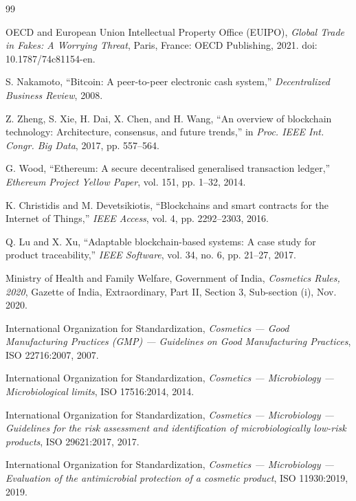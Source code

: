 \documentclass[12pt,a4paper]{report}
\begin{document}
\begin{thebibliography}{99}

 OECD and European Union Intellectual Property Office (EUIPO), \textit{Global Trade in Fakes: A Worrying Threat}, Paris, France: OECD Publishing, 2021. doi: 10.1787/74c81154-en.

 S. Nakamoto, ``Bitcoin: A peer-to-peer electronic cash system,'' \textit{Decentralized Business Review}, 2008.

 Z. Zheng, S. Xie, H. Dai, X. Chen, and H. Wang, ``An overview of blockchain technology: Architecture, consensus, and future trends,'' in \textit{Proc. IEEE Int. Congr. Big Data}, 2017, pp. 557--564.

 G. Wood, ``Ethereum: A secure decentralised generalised transaction ledger,'' \textit{Ethereum Project Yellow Paper}, vol. 151, pp. 1--32, 2014.

 K. Christidis and M. Devetsikiotis, ``Blockchains and smart contracts for the Internet of Things,'' \textit{IEEE Access}, vol. 4, pp. 2292--2303, 2016.

 Q. Lu and X. Xu, ``Adaptable blockchain-based systems: A case study for product traceability,'' \textit{IEEE Software}, vol. 34, no. 6, pp. 21--27, 2017.

 Ministry of Health and Family Welfare, Government of India, \textit{Cosmetics Rules, 2020}, Gazette of India, Extraordinary, Part II, Section 3, Sub-section (i), Nov. 2020.

 International Organization for Standardization, \textit{Cosmetics --- Good Manufacturing Practices (GMP) --- Guidelines on Good Manufacturing Practices}, ISO 22716:2007, 2007.

 International Organization for Standardization, \textit{Cosmetics --- Microbiology --- Microbiological limits}, ISO 17516:2014, 2014.

 International Organization for Standardization, \textit{Cosmetics --- Microbiology --- Guidelines for the risk assessment and identification of microbiologically low-risk products}, ISO 29621:2017, 2017.

 International Organization for Standardization, \textit{Cosmetics --- Microbiology --- Evaluation of the antimicrobial protection of a cosmetic product}, ISO 11930:2019, 2019.


\end{thebibliography}
\end{document}
